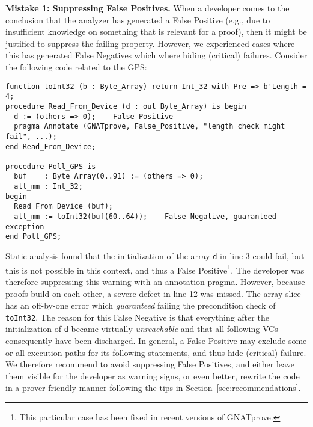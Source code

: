 \textbf{Mistake 1: Suppressing False Positives.} When a developer
comes to the conclusion that the analyzer has generated a False
Positive (e.g., due to insufficient knowledge on something that is
relevant for a proof), then it might be justified to suppress the
failing property. However, we experienced cases where this has generated
False Negatives which where hiding (critical) failures.  Consider the
following code related to %
the GPS: %
\begin{lstlisting}[name=missedbug,escapechar=\$]
function toInt32 (b : Byte_Array) return Int_32 with Pre => b'Length = 4;
procedure Read_From_Device (d : out Byte_Array) is begin
  d := (others => 0); -- False Positive
  pragma Annotate (GNATprove, False_Positive, "length check might fail", ...);
end Read_From_Device;

procedure Poll_GPS is
  buf    : Byte_Array(0..91) := (others => 0);
  alt_mm : Int_32;
begin
  Read_From_Device (buf);
  alt_mm := toInt32(buf(60..64)); -- False Negative, guaranteed exception
end Poll_GPS;
\end{lstlisting}
Static analysis found that the initialization of the array \lstinline$d$
in line 3 could fail, but this is not possible in this context, and
thus a False Positive\footnote{This particular case has been fixed in recent versions of GNATprove.}. The developer
was therefore suppressing this warning with an annotation
pragma. However, because proofs build on each other, a severe defect
in line 12 was missed. The array slice has an off-by-one error which
\emph{guaranteed} failing the precondition check of
\lstinline$toInt32$.  The reason for this False Negative is that
everything after the initialization of \lstinline$d$ became virtually
\emph{unreachable} and that all following VCs consequently have been discharged.  
In general, a False Positive may exclude some or all execution paths
for its following statements, and thus
hide (critical) failure. We therefore recommend to avoid suppressing False Positives, and either
leave them visible for the developer as warning signs, or even better, rewrite the code in a prover-friendly manner following the tips in Section~\ref{sec:recommendations}.

